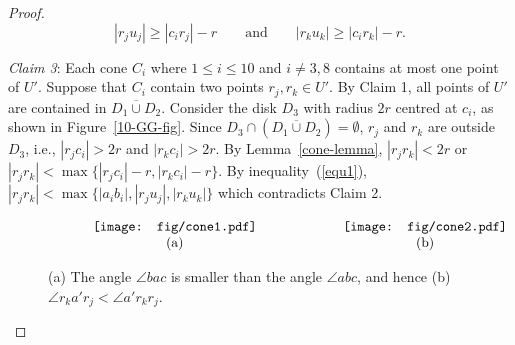\documentclass[11pt,a4paper]{article}
\begin{document}
\begin{proof}
\begin{equation}\label{equ1}
|r_ju_j|\ge |c_ir_j|-r \quad\quad\text{and} \quad\quad |r_ku_k|\ge |c_ir_k|-r.
\end{equation}


{\em Claim 3}: Each cone $C_i$ where $1\le i\le 10$ and $i\neq 3,8$ contains at most one point of $U'$. Suppose that $C_i$ contain two points $r_j,r_k \in U'$. By Claim 1, all points of $U'$ are contained in $\overline{D_1\cup D_2}$. Consider the disk $D_3$ with radius $2r$ centred at $c_i$, as shown in Figure~\ref{10-GG-fig}. Since $D_3\cap \allowbreak(\overline{D_1\cup D_2})=\allowbreak\emptyset$, $r_j$ and $r_k$ are outside $D_3$, i.e., $|r_jc_i| > 2r$ and $|r_kc_i|>2r$. By Lemma~\ref{cone-lemma}, $|r_jr_k| < 2r$ or $|r_jr_k| \allowbreak<\allowbreak \max\{|r_jc_i| − r, \allowbreak |r_kc_i|− r\}$. By inequality~(\ref{equ1}), $|r_jr_k| < \max\{|a_ib_i|,|r_ju_j|,|r_ku_k|\}$ which contradicts Claim 2.

\begin{figure}[htb]
  \centering
\setlength{\tabcolsep}{0in}
  $\begin{tabular}{cc}
 \multicolumn{1}{m{.5\columnwidth}}{\centering\texttt{[image: fig/cone1.pdf]}}
&\multicolumn{1}{m{.5\columnwidth}}{\centering\texttt{[image: fig/cone2.pdf]}}\\
(a) & (b)
\end{tabular}$
  \caption{(a) The angle $\angle bac$ is smaller than the angle $\angle abc$, and hence (b) $\angle r_ka'r_j <\angle a'r_kr_j$.}
\label{cone-fig}
\end{figure}


\end{proof}
\end{document}
